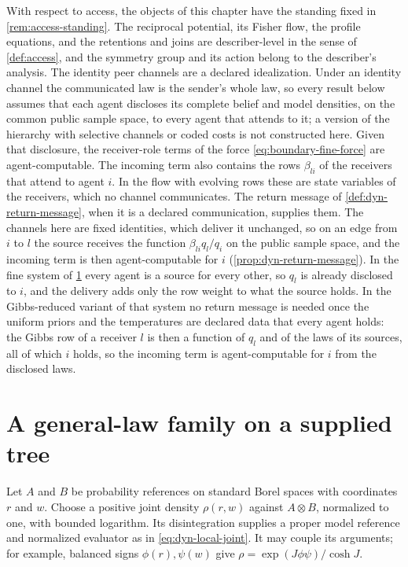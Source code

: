 With respect to access, the objects of this chapter have the standing fixed in \cref{rem:access-standing}. The reciprocal potential, its Fisher flow, the profile equations, and the retentions and joins are describer-level in the sense of \cref{def:access}, and the symmetry group and its action belong to the describer's analysis. The identity peer channels are a declared idealization. Under an identity channel the communicated law is the sender's whole law, so every result below assumes that each agent discloses its complete belief and model densities, on the common public sample space, to every agent that attends to it; a version of the hierarchy with selective channels or coded costs is not constructed here. Given that disclosure, the receiver-role terms of the force \cref{eq:boundary-fine-force} are agent-computable. The incoming term also contains the rows $\beta_{li}$ of the receivers that attend to agent $i$. In the flow with evolving rows these are state variables of the receivers, which no channel communicates. The return message of \cref{def:dyn-return-message}, when it is a declared communication, supplies them. The channels here are fixed identities, which deliver it unchanged, so on an edge from $i$ to $l$ the source receives the function $\beta_{li}q_l/q_i$ on the public sample space, and the incoming term is then agent-computable for $i$ (\cref{prop:dyn-return-message}). In the fine system of \cref{sec:boundary-tree-family} every agent is a source for every other, so $q_l$ is already disclosed to $i$, and the delivery adds only the row weight to what the source holds. In the Gibbs-reduced variant of that system no return message is needed once the uniform priors and the temperatures are declared data that every agent holds: the Gibbs row of a receiver $l$ is then a function of $q_l$ and of the laws of its sources, all of which $i$ holds, so the incoming term is agent-computable for $i$ from the disclosed laws.

\section{A general-law family on a supplied tree}
\label{sec:boundary-tree-family}

Let $A$ and $B$ be probability references on standard Borel spaces with coordinates $r$ and $w$. Choose a positive joint density $\rho(r,w)$ against $A\otimes B$, normalized to one, with bounded logarithm. Its disintegration supplies a proper model reference and normalized evaluator as in \cref{eq:dyn-local-joint}. It may couple its arguments; for example, balanced signs $\phi(r),\psi(w)$ give $\rho=\exp(J\phi\psi)/\cosh J$.

